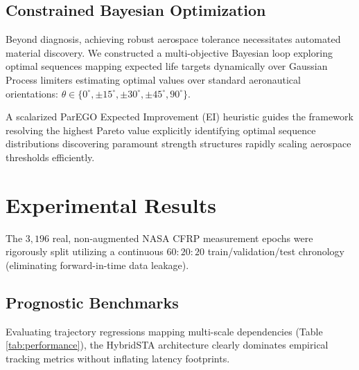 \documentclass[conference]{IEEEtran}
\begin{document}
\subsection{Constrained Bayesian Optimization}

Beyond diagnosis, achieving robust aerospace tolerance necessitates automated material discovery. We constructed a multi-objective Bayesian loop exploring optimal sequences mapping expected life targets dynamically over Gaussian Process limiters estimating optimal values over standard aeronautical orientations: $\theta \in \{0^\circ, \pm 15^\circ, \pm 30^\circ, \pm 45^\circ, 90^\circ\}$.

A scalarized ParEGO Expected Improvement (EI) heuristic guides the framework resolving the highest Pareto value explicitly identifying optimal sequence distributions discovering paramount strength structures rapidly scaling aerospace thresholds efficiently. 


\section{Experimental Results}

The $3,196$ real, non-augmented NASA CFRP measurement epochs were rigorously split utilizing a continuous $60:20:20$ train/validation/test chronology (eliminating forward-in-time data leakage). 

\subsection{Prognostic Benchmarks}

Evaluating trajectory regressions mapping multi-scale dependencies (Table \ref{tab:performance}), the HybridSTA architecture clearly dominates empirical tracking metrics without inflating latency footprints.
\end{document}
